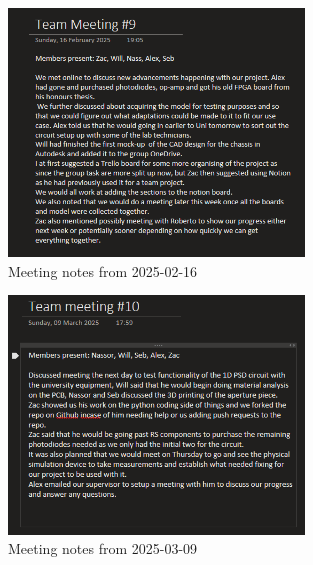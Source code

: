                             
                            \begin{figure}[htbp]
                                \centering
                                \includegraphics[width=0.7\textwidth]{figures/Appendix-MeetingNotes/meeting9.png}
                                \caption*{Meeting notes from 2025-02-16} 
                                \label{fig:meeting9}
                                \end{figure}

                                
                                \begin{figure}[htbp]
                                    \centering
                                    \includegraphics[width=0.7\textwidth]{figures/Appendix-MeetingNotes/meeting10.png}
                                    \caption*{Meeting notes from 2025-03-09} 
                                    \label{fig:meeting10}
                                    \end{figure}

